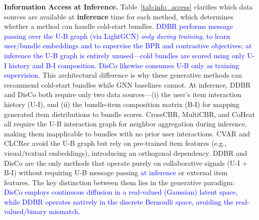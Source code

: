 \documentclass[lettersize,journal]{IEEEtran}
\newcommand{\revise}[1]{\textcolor{blue}{#1}}
\begin{document}





\noindent\textbf{Information Access at Inference.}
Table~\ref{tab:info_access} clarifies which data sources are available at \textbf{inference} time for each method, which determines whether a method can handle cold-start bundles. \revise{DDBR performs message passing over the U-B graph (via LightGCN) \emph{only during training}, to learn user/bundle embeddings and to supervise the BPR and contrastive objectives; at inference the U-B graph is entirely unused---cold bundles are scored using only U-I history and B-I composition. DisCo likewise consumes U-B only as training supervision.} This architectural difference is why these generative methods can recommend cold-start bundles while GNN baselines cannot. At inference, DDBR and DisCo both require only two data sources---(i) the user's item interaction history (U-I), and (ii) the bundle-item composition matrix (B-I) for mapping generated item distributions to bundle scores. CrossCBR, MultiCBR, and CoHeat all require the U-B interaction graph for neighbor aggregation during inference, making them inapplicable to bundles with no prior user interactions. CVAR and CLCRec avoid the U-B graph but rely on pre-trained item features (e.g., visual/textual embeddings), introducing an orthogonal dependency. DDBR and DisCo are the only methods that operate purely on collaborative signals (U-I + B-I) without requiring U-B message passing \revise{at inference} or external item features. The key distinction between them lies in the generative paradigm: \revise{DisCo employs continuous diffusion in a real-valued (Gaussian) latent space, while DDBR operates natively in the discrete Bernoulli space, avoiding the real-valued/binary mismatch.}
\end{document}
